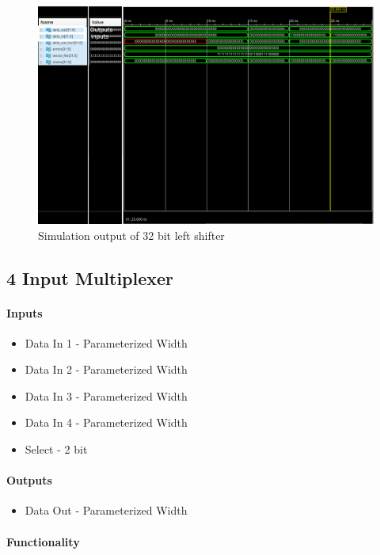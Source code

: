 \documentclass{article}
\begin{document}
    \begin{figure}[H]
        \centering
        \includegraphics[width=0.9\paperwidth,center]{Screenshots/left_shift.png}
        \caption{Simulation output of 32 bit left shifter}
    \end{figure}



    \subsection{4 Input Multiplexer}

    \paragraph{Inputs}
    \begin{itemize}
        \item Data In 1 - Parameterized Width
        \item Data In 2 - Parameterized Width
        \item Data In 3 - Parameterized Width
        \item Data In 4 - Parameterized Width
        \item Select - 2 bit
    \end{itemize}

    \paragraph{Outputs}
    \begin{itemize}
        \item Data Out - Parameterized Width
    \end{itemize}

    \paragraph{Functionality}
    \hfill\\
\end{document}
